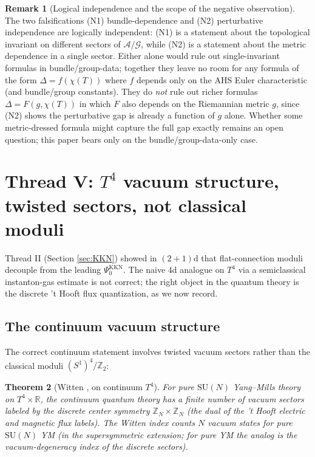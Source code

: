 \documentclass[11pt,letterpaper]{article}
\newtheorem{theorem}{Theorem}[section]
\theoremstyle{definition}
\newtheorem{remark}[theorem]{Remark}
\newcommand{\bbR}{\mathbb{R}}
\newcommand{\bbZ}{\mathbb{Z}}
\newcommand{\cA}{\mathcal{A}}
\newcommand{\cG}{\mathcal{G}}
\begin{document}
\begin{remark}[Logical independence and the scope of the negative observation]\label{rmk:N1-vs-N2}
The two falsifications (N1) bundle-dependence and (N2) perturbative independence are logically independent: (N1) is a statement about the topological invariant on different sectors of $\cA/\cG$, while (N2) is a statement about the metric dependence in a single sector. Either alone would rule out single-invariant formulas in bundle/group-data; together they leave no room for any formula of the form $\Delta = f(\chi(T))$ where $f$ depends only on the AHS Euler characteristic (and bundle/group constants). They do \emph{not} rule out richer formulas $\Delta = F(g, \chi(T))$ in which $F$ also depends on the Riemannian metric $g$, since (N2) shows the perturbative gap is already a function of $g$ alone. Whether some metric-dressed formula might capture the full gap exactly remains an open question; this paper bears only on the bundle/group-data-only case.
\end{remark}

\section{Thread V: $T^4$ vacuum structure, twisted sectors, not classical moduli}\label{sec:T4}

Thread II (Section \ref{sec:KKN}) showed in $(2{+}1)$d that flat-connection moduli decouple from the leading $\Psi_0^{\mathrm{KKN}}$. The naive $4$d analogue on $T^4$ via a semiclassical instanton-gas estimate is not correct; the right object in the quantum theory is the discrete 't Hooft flux quantization, as we now record.

\subsection{The continuum vacuum structure}

The correct continuum statement involves twisted vacuum sectors rather than the classical moduli $(S^1)^4/\bbZ_2$:

\begin{theorem}[Witten \cite{Witten1982}, on continuum $T^4$]\label{thm:Witten-T4}
For pure $\mathrm{SU}(N)$ Yang--Mills theory on $T^4 \times \bbR$, the continuum quantum theory has a finite number of vacuum sectors labeled by the discrete center symmetry $\bbZ_N \times \bbZ_N$ (the dual of the 't Hooft electric and magnetic flux labels). The Witten index counts $N$ vacuum states for pure $\mathrm{SU}(N)$ YM (in the supersymmetric extension; for pure YM the analog is the vacuum-degeneracy index of the discrete sectors).
\end{theorem}
\end{document}
